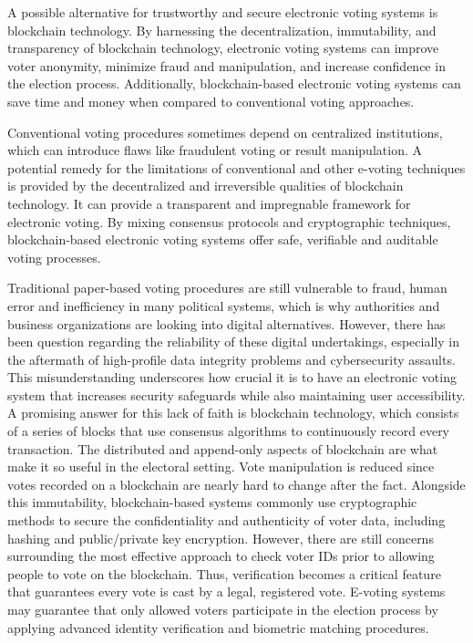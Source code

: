 \documentclass[a4paper,10pt]{report}
\begin{document}
 A possible alternative for trustworthy and secure electronic voting systems is blockchain technology.  By harnessing the decentralization, immutability, and transparency of blockchain technology, electronic voting systems can improve voter anonymity, minimize fraud and manipulation, and increase confidence in the election process.  Additionally, blockchain-based electronic voting systems can save time and money when compared to conventional voting approaches.

 Conventional voting procedures sometimes depend on centralized institutions, which can introduce flaws like fraudulent voting or result manipulation.  A potential remedy for the limitations of conventional and other e-voting techniques is provided by the decentralized and irreversible qualities of blockchain technology.  It can provide a transparent and impregnable framework for electronic voting.  By mixing consensus protocols and cryptographic techniques, blockchain-based electronic voting systems offer safe, verifiable and auditable voting processes.
 
 Traditional paper-based voting procedures are still vulnerable to fraud, human error and inefficiency in many political systems, which is why authorities and business organizations are looking into digital alternatives.  However, there has been question regarding the reliability of these digital undertakings, especially in the aftermath of high-profile data integrity problems and cybersecurity assaults.  This misunderstanding underscores how crucial it is to have an electronic voting system that increases security safeguards while also maintaining user accessibility.  A promising answer for this lack of faith is blockchain technology, which consists of a series of blocks that use consensus algorithms to continuously record every transaction.
 The distributed and append-only aspects of blockchain are what make it so useful in the electoral setting.  Vote manipulation is reduced since votes recorded on a blockchain are nearly hard to change after the fact.  Alongside this immutability, blockchain-based systems commonly use cryptographic methods to secure the confidentiality and authenticity of voter data, including hashing and public/private key encryption.  However, there are still concerns surrounding the most effective approach to check voter IDs prior to allowing people to vote on the blockchain.  Thus, verification becomes a critical feature that guarantees every vote is cast by a legal, registered vote.  E-voting systems may guarantee that only allowed voters participate in the election process by applying advanced identity verification and biometric matching procedures. 
 
\end{document}

